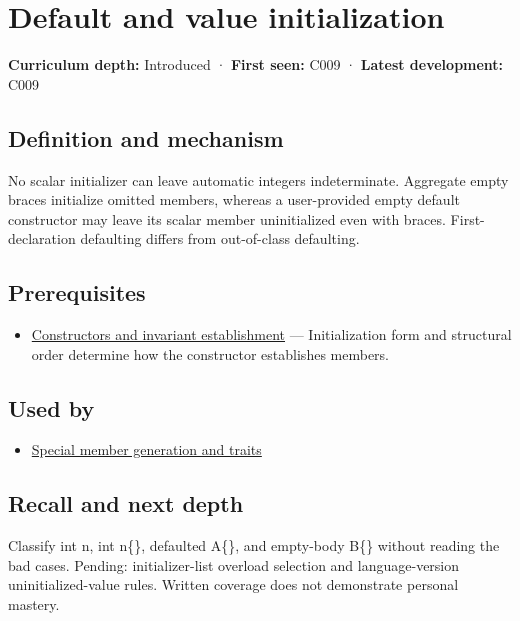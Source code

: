 \hypertarget{appendix-ba8c1a9fe03f}{}
\section{Default and value initialization}\label{appendix-ba8c1a9fe03f-default-and-value-initialization}

\textbf{Curriculum depth:} Introduced · \textbf{First seen:} C009 · \textbf{Latest development:} C009

\subsection{Definition and mechanism}\label{appendix-ba8c1a9fe03f-definition-and-mechanism}

No scalar initializer can leave automatic integers indeterminate. Aggregate empty braces initialize omitted members, whereas a user-provided empty default constructor may leave its scalar member uninitialized even with braces. First-declaration defaulting differs from out-of-class defaulting.

\subsection{Prerequisites}\label{appendix-ba8c1a9fe03f-prerequisites}

\begin{itemize}
\tightlist
\item
  \hyperref[appendix-7f8ec83d0886]{Constructors and invariant establishment} --- Initialization form and structural order determine how the constructor establishes members.
\end{itemize}

\subsection{Used by}\label{appendix-ba8c1a9fe03f-used-by}

\begin{itemize}
\tightlist
\item
  \hyperref[appendix-42e02a12c694]{Special member generation and traits}
\end{itemize}

\subsection{Recall and next depth}\label{appendix-ba8c1a9fe03f-recall-and-next-depth}

Classify int n, int n\{\}, defaulted A\{\}, and empty-body B\{\} without reading the bad cases. Pending: initializer-list overload selection and language-version uninitialized-value rules. Written coverage does not demonstrate personal mastery.

